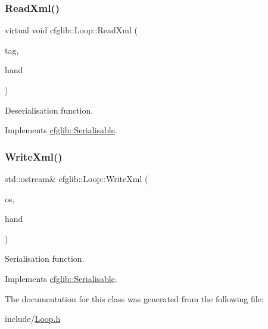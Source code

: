 \mbox{\label{classcfglib_1_1Loop_a9bca6f0b552a7863259d34611dff7b4a}} 
\subsubsection{\texorpdfstring{Read\+Xml()}{ReadXml()}}
{\footnotesize\ttfamily virtual void cfglib\+::\+Loop\+::\+Read\+Xml (\begin{DoxyParamCaption}\item[{\hyperlink{classXmlTag}{Xml\+Tag} const $\ast$}]{tag,  }\item[{\hyperlink{classcfglib_1_1Handle}{Handle} \&}]{hand }\end{DoxyParamCaption})\hspace{0.3cm}{\ttfamily [virtual]}}

Deserialisation function. 

Implements \hyperlink{classcfglib_1_1Serialisable_a876d530446317872259356af9b016e13}{cfglib\+::\+Serialisable}.

\mbox{\label{classcfglib_1_1Loop_a66cf343ede5add1036351ffd35d85065}} 
\subsubsection{\texorpdfstring{Write\+Xml()}{WriteXml()}}
{\footnotesize\ttfamily std\+::ostream\& cfglib\+::\+Loop\+::\+Write\+Xml (\begin{DoxyParamCaption}\item[{std\+::ostream \&}]{os,  }\item[{\hyperlink{classcfglib_1_1Handle}{Handle} \&}]{hand }\end{DoxyParamCaption})\hspace{0.3cm}{\ttfamily [virtual]}}

Serialisation function. 

Implements \hyperlink{classcfglib_1_1Serialisable_aaeb80cc7397ad312e5ae34f39412ce42}{cfglib\+::\+Serialisable}.



The documentation for this class was generated from the following file\+:\begin{DoxyCompactItemize}
\item 
include/\hyperlink{Loop_8h}{Loop.\+h}\end{DoxyCompactItemize}
